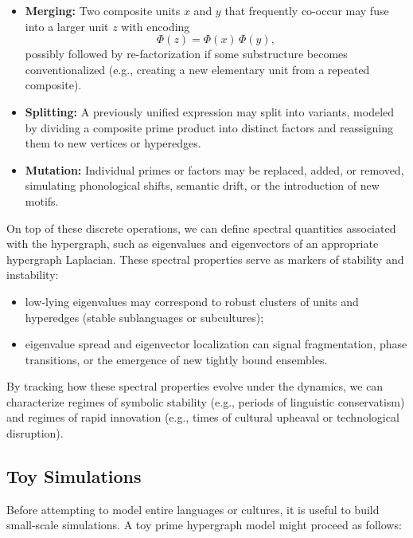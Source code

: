 \documentclass[12]{amsart}
\theoremstyle{plain}
\begin{document}
\begin{itemize}
  \item \textbf{Merging:} Two composite units $x$ and $y$ that frequently co-occur may fuse into a larger unit $z$ with encoding
  \[
    \Phi(z) = \Phi(x)\,\Phi(y),
  \]
  possibly followed by re-factorization if some substructure becomes conventionalized (e.g., creating a new elementary unit from a repeated composite).
  \item \textbf{Splitting:} A previously unified expression may split into variants, modeled by dividing a composite prime product into distinct factors and reassigning them to new vertices or hyperedges.
  \item \textbf{Mutation:} Individual primes or factors may be replaced, added, or removed, simulating phonological shifts, semantic drift, or the introduction of new motifs.
\end{itemize}

On top of these discrete operations, we can define spectral quantities associated with the hypergraph, such as eigenvalues and eigenvectors of an appropriate hypergraph Laplacian. These spectral properties serve as markers of stability and instability:

\begin{itemize}
  \item low-lying eigenvalues may correspond to robust clusters of units and hyperedges (stable sublanguages or subcultures);
  \item eigenvalue spread and eigenvector localization can signal fragmentation, phase transitions, or the emergence of new tightly bound ensembles.
\end{itemize}

By tracking how these spectral properties evolve under the dynamics, we can characterize regimes of symbolic stability (e.g., periods of linguistic conservatism) and regimes of rapid innovation (e.g., times of cultural upheaval or technological disruption).

\subsection{Toy Simulations}

Before attempting to model entire languages or cultures, it is useful to build small-scale simulations. A toy prime hypergraph model might proceed as follows:
\end{document}
